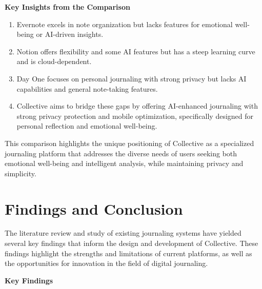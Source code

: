 \textbf{Key Insights from the Comparison}

\begin{enumerate}
	\item Evernote excels in note organization but lacks features for emotional well-being or AI-driven insights.
	
	\item Notion offers flexibility and some AI features but has a steep learning curve and is cloud-dependent.
	
	\item Day One focuses on personal journaling with strong privacy but lacks AI capabilities and general note-taking features.
	
	\item Collective aims to bridge these gaps by offering AI-enhanced journaling with strong privacy protection and mobile optimization, specifically designed for personal reflection and emotional well-being.
\end{enumerate}

This comparison highlights the unique positioning of Collective as a specialized journaling platform that addresses the diverse needs of users seeking both emotional well-being and intelligent analysis, while maintaining privacy and simplicity.

\section{Findings and Conclusion}\label{sec:findings}

The literature review and study of existing journaling systems have yielded several key findings that inform the design and development of Collective. These findings highlight the strengths and limitations of current platforms, as well as the opportunities for innovation in the field of digital journaling.

\textbf{Key Findings}

